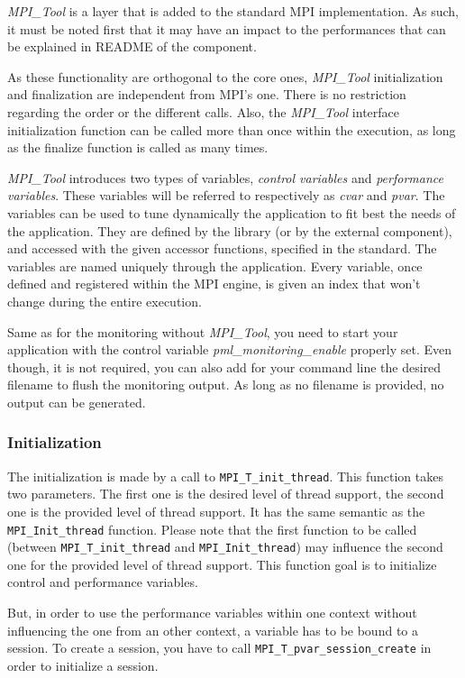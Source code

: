\documentclass[notitlepage]{article}
\newcommand{\mpit}[1]{\textit{MPI\_Tool#1}}
\begin{document}
\mpit{} is a layer that is added to the standard MPI
implementation. As such, it must be noted first that it may have an
impact to the performances that can be explained in README of the
component.

As these functionality are orthogonal to the core ones, \mpit{}
initialization and finalization are independent from MPI's one. There
is no restriction regarding the order or the different calls. Also,
the \mpit{} interface initialization function can be called more than
once within the execution, as long as the finalize function is called
as many times.

\mpit{} introduces two types of variables, \textit{control variables}
and \textit{performance variables}. These variables will be referred to
respectively as \textit{cvar} and \textit{pvar}. The variables can be
used to tune dynamically the application to fit best the needs of the
application. They are defined by the library (or by the external
component), and accessed with the given accessor functions, specified
in the standard. The variables are named uniquely through the
application. Every variable, once defined and registered within the
MPI engine, is given an index that won't change during the entire
execution.

Same as for the monitoring without \mpit{}, you need to start your
application with the control variable \textit{pml\_monitoring\_enable}
properly set. Even though, it is not required, you can also add for
your command line the desired filename to flush the monitoring
output. As long as no filename is provided, no output can be
generated.

\subsubsection{Initialization}

The initialization is made by a call to \texttt{MPI\_T\_init\_thread}.
This function takes two parameters. The first one is the desired level
of thread support, the second one is the provided level of thread
support. It has the same semantic as the \texttt{MPI\_Init\_thread}
function. Please note that the first function to be called (between
\texttt{MPI\_T\_init\_thread} and \texttt{MPI\_Init\_thread}) may
influence the second one for the provided level of thread
support. This function goal is to initialize control and performance
variables.

But, in order to use the performance variables within one context
without influencing the one from an other context, a variable has to
be bound to a session. To create a session, you have to call
\texttt{MPI\_T\_pvar\_session\_create} in order to initialize a session.
\end{document}
